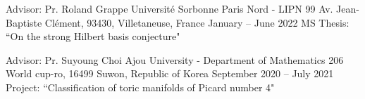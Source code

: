 

\begin{cventries}

\cventry
{Advisor: Pr. Roland Grappe} %
{Université Sorbonne Paris Nord - LIPN} %
{99 Av. Jean-Baptiste Clément, 93430, Villetaneuse, France} %
{January -- June 2022} %
{MS Thesis: ``On the strong Hilbert basis conjecture"}


  \cventry
    {Advisor: Pr. Suyoung Choi} %
    {Ajou University - Department of Mathematics} %
    {206 World cup-ro, 16499 Suwon, Republic of Korea} %
    {September 2020 -- July 2021} %
    {Project: ``Classification of toric manifolds of Picard number 4"}

\end{cventries}
